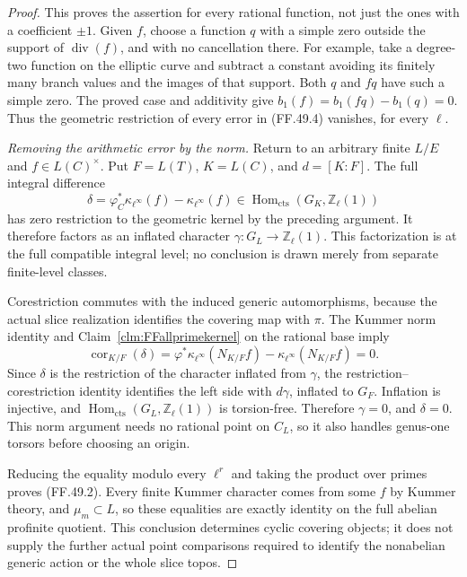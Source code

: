 \begin{proof}
This proves the assertion for every rational
function, not just the ones with a coefficient
\(\pm1\). Given \(f\), choose a function \(q\)
with a simple zero outside the support of
\(\operatorname{div}(f)\), and with no cancellation
there. For example, take a degree-two function on
the elliptic curve and subtract a constant avoiding
its finitely many branch values and the images of
that support. Both \(q\) and \(fq\) have such
a simple zero. The proved case and additivity give
\(b_1(f)=b_1(fq)-b_1(q)=0\).
Thus the geometric restriction of every error in
(FF.49.4) vanishes, for every \(\ell\).

\emph{Removing the arithmetic error by the norm.}
Return to an arbitrary finite \(L/E\) and
\(f\in L(C)^\times\). Put
\(F=L(T)\), \(K=L(C)\), and
\(d=[K:F]\). The full integral difference
\[
       \delta=\varphi_C^*\kappa_{\ell^\infty}(f)
                         -\kappa_{\ell^\infty}(f)
          \in\operatorname{Hom}_{\mathrm{cts}}
                     (G_K,\mathbb Z_\ell(1))
                                                        \tag{FF.49.8}
\]
has zero restriction to the geometric kernel by
the preceding argument. It therefore factors as
an inflated character
\(\gamma:G_L\to\mathbb Z_\ell(1)\).
This factorization is at the full compatible
integral level; no conclusion is drawn merely
from separate finite-level classes.

Corestriction commutes with the induced generic
automorphisms, because the actual slice realization
identifies the covering map with \(\pi\). The
Kummer norm identity and
Claim~\ref{clm:FFallprimekernel} on the rational
base imply
\[
 \operatorname{cor}_{K/F}(\delta)
       =\varphi^*\kappa_{\ell^\infty}(N_{K/F}f)
                   -\kappa_{\ell^\infty}(N_{K/F}f)=0.
                                                        \tag{FF.49.9}
\]
Since \(\delta\) is the restriction of the
character inflated from \(\gamma\), the
restriction--corestriction identity identifies the
left side with \(d\gamma\), inflated to \(G_F\).
Inflation is injective, and
\(\operatorname{Hom}_{\mathrm{cts}}
(G_L,\mathbb Z_\ell(1))\) is torsion-free.
Therefore \(\gamma=0\), and \(\delta=0\).
This norm argument needs no rational point on
\(C_L\), so it also handles genus-one torsors
before choosing an origin.

Reducing the equality modulo every \(\ell^r\)
and taking the product over primes proves
(FF.49.2). Every finite Kummer character comes
from some \(f\) by Kummer theory, and
\(\mu_m\subset L\), so these equalities are
exactly identity on the full abelian profinite
quotient. This conclusion determines cyclic
covering objects; it does not supply the further
actual point comparisons required to identify
the nonabelian generic action or the whole slice
topos.
\end{proof}
